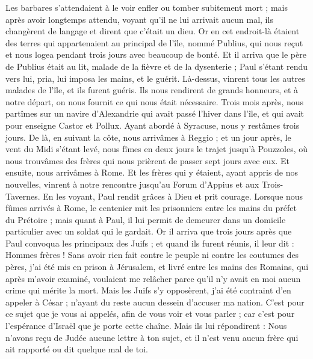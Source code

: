 \begin{multicols}{2}
{{{Les barbares s'attendaient à le voir enfler ou tomber subitement mort ; mais après avoir longtemps attendu, voyant qu'il ne lui arrivait aucun mal, ils changèrent de langage et dirent que c'était un dieu.
Or en cet endroit-là étaient des terres qui appartenaient au principal de l'île, nommé Publius, qui nous reçut et nous logea pendant trois jours avec beaucoup de bonté.
Et il arriva que le père de Publius était au lit, malade de la fièvre et de la dysenterie ; Paul s'étant rendu vers lui, pria, lui imposa les mains, et le guérit.
Là-dessus, vinrent tous les autres malades de l'île, et ils furent guéris.
Ils nous rendirent de grands honneurs, et à notre départ, on nous fournit ce qui nous était nécessaire.
Trois mois après, nous partîmes sur un navire d'Alexandrie qui avait passé l'hiver dans l'île, et qui avait pour enseigne Castor et Pollux.
Ayant abordé à Syracuse, nous y restâmes trois jours.
De là, en suivant la côte, nous arrivâmes à Reggio ; et un jour après, le vent du Midi s'étant levé, nous fîmes en deux jours le trajet jusqu'à Pouzzoles,
où nous trouvâmes des frères qui nous prièrent de passer sept jours avec eux. Et ensuite, nous arrivâmes à Rome.
Et les frères qui y étaient, ayant appris de nos nouvelles, vinrent à notre rencontre jusqu'au Forum d'Appius et aux Trois-Tavernes. En les voyant, Paul rendit grâces à Dieu et prit courage.
Lorsque nous fûmes arrivés à Rome, le centenier mit les prisonniers entre les mains du préfet du Prétoire ; mais quant à Paul, il lui permit de demeurer dans un domicile particulier avec un soldat qui le gardait.
Or il arriva que trois jours après que Paul convoqua les principaux des Juifs ; et quand ils furent réunis, il leur dit : Hommes frères ! Sans avoir rien fait contre le peuple ni contre les coutumes des pères, j'ai été mis en prison à Jérusalem, et livré entre les mains des Romains,
qui après m'avoir examiné, voulaient me relâcher parce qu'il n'y avait en moi aucun crime qui mérite la mort.
Mais les Juifs s'y opposèrent, j'ai été contraint d'en appeler à César ; n'ayant du reste aucun dessein d'accuser ma nation.
C'est pour ce sujet que je vous ai appelés, afin de vous voir et vous parler ; car c'est pour l'espérance d'Israël que je porte cette chaîne.
Mais ils lui répondirent : Nous n'avons reçu de Judée aucune lettre à ton sujet, et il n'est venu aucun frère qui ait rapporté ou dit quelque mal de toi.
}}}
\end{multicols}
